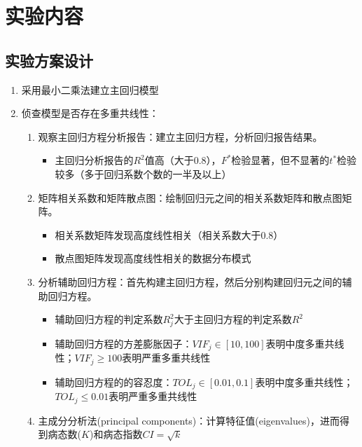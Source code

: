 \documentclass[12pt,(landscape,a4paper),(portrait,a4paper)]{article}
\providecommand{\tightlist}{%
  \setlength{\itemsep}{0pt}\setlength{\parskip}{0pt}}
\let\stdsection\section
\renewcommand\section{\newpage\stdsection}
\begin{document}
\newpage

\section{实验内容}

\subsection{实验方案设计}

\begin{enumerate}
\def\labelenumi{\arabic{enumi}.}
\tightlist
\item
  采用最小二乘法建立主回归模型
\item
  侦查模型是否存在多重共线性：

  \begin{enumerate}
  \def\labelenumii{\alph{enumii}.}
  \tightlist
  \item
    观察主回归方程分析报告：建立主回归方程，分析回归报告结果。

    \begin{itemize}
    \tightlist
    \item
      主回归分析报告的\(R^2\)值高（大于0.8），\(F^{\ast}\)检验显著，但不显著的\(t^\ast\)检验较多（多于回归系数个数的一半及以上）
    \end{itemize}
  \item
    矩阵相关系数和矩阵散点图：绘制回归元之间的相关系数矩阵和散点图矩阵。

    \begin{itemize}
    \tightlist
    \item
      相关系数矩阵发现高度线性相关（相关系数大于0.8）
    \item
      散点图矩阵发现高度线性相关的数据分布模式
    \end{itemize}
  \item
    分析辅助回归方程：首先构建主回归方程，然后分别构建回归元之间的辅助回归方程。

    \begin{itemize}
    \tightlist
    \item
      辅助回归方程的判定系数\(R^2_j\)大于主回归方程的判定系数\(R^2\)
    \item
      辅助回归方程的方差膨胀因子：\(VIF_j\in[10,100]\)表明中度多重共线性；\(VIF_j\geq{100}\)表明严重多重共线性
    \item
      辅助回归方程的的容忍度：\(TOL_j\in[0.01,0.1]\)表明中度多重共线性；\(TOL_j\leq{0.01}\)表明严重多重共线性
    \end{itemize}
  \item
    主成分分析法(principal
    components)：计算特征值(eigenvalues)，进而得到病态数(\(K\))和病态指数\(CI=\sqrt{k}\)


\end{enumerate}
\end{enumerate}
\end{document}
